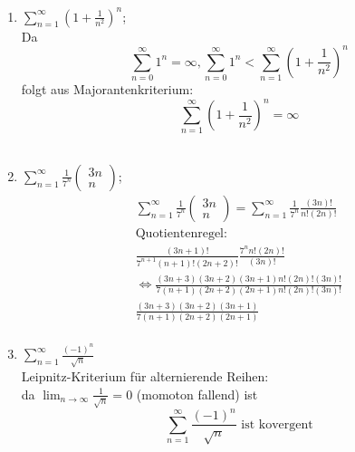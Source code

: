 \documentclass{HM}
\begin{document}
\begin{enumerate}
\begin{enumerate}
\item $\sum\limits_{n=1}^\infty(1+\frac{1}{n^2})^n$;\\
Da $$\sum\limits_{n=0}^\infty 1^n = \infty, \sum\limits_{n=0}^\infty 1^n < \sum\limits_{n=1}^\infty(1+\frac{1}{n^2})^n$$
folgt aus Majorantenkriterium: \\
$$\sum\limits_{n=1}^\infty(1+\frac{1}{n^2})^n = \infty$$
\\
\item $\sum\limits_{n=1}^\infty\frac{1}{7^n}\begin{pmatrix}
3n\\
n
\end{pmatrix}$;\\
\begin{align*}
	\sum\limits_{n=1}^\infty\frac{1}{7^n}\begin{pmatrix}
		3n\\
		n
	\end{pmatrix} = \sum\limits_{n=1}^\infty\frac{1}{7^n} \frac{(3n)!}{n!(2n)!}\\
	\text{Quotientenregel:}\\
	\frac{(3n+1)!}{7^{n+1}(n+1)!(2n+2)!}\frac{7^nn!(2n)!}{(3n)!}\\
	\Leftrightarrow \frac{(3n+3)(3n+2)(3n+1)n!(2n)!(3n)!}{7(n+1)(2n+2)(2n+1)n!(2n)!(3n)!}\\
	\frac{(3n+3)(3n+2)(3n+1)}{7(n+1)(2n+2)(2n+1)}\\
	\end{align*}
\item $\sum\limits_{n=1}^\infty\frac{(-1)^n}{\sqrt{n}}$\\
Leipnitz-Kriterium für alternierende Reihen:\\
da $\lim_{n\to\infty} \frac{1}{\sqrt{n}} = 0$ (momoton fallend) ist $$\sum\limits_{n=1}^\infty\frac{(-1)^n}{\sqrt{n}}\text{ ist kovergent}$$ 

\end{enumerate}

\end{enumerate}
\end{document}
